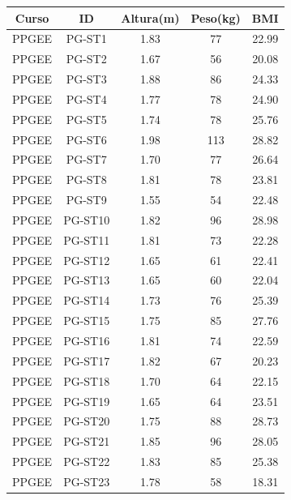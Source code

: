 \documentclass[12pt, a4paper]{article}
\begin{document}
\begin{longtable}{|c|c|c|c|c|}
\hline
\rule[-1.0ex]{0pt}{4.0ex}
\textbf{Curso}&\textbf{ID}&\textbf{Altura(m)}&\textbf{Peso(kg)}&\textbf{BMI}\\ \hline
\endhead
\rule[-1.0ex]{0pt}{4.0ex}
PPGEE&PG-ST1&1.83&77&22.99 \\ \hline
\rule[-1.0ex]{0pt}{4.0ex}
PPGEE&PG-ST2&1.67&56&20.08 \\ \hline
\rule[-1.0ex]{0pt}{4.0ex}
PPGEE&PG-ST3&1.88&86&24.33 \\ \hline
\rule[-1.0ex]{0pt}{4.0ex}
PPGEE&PG-ST4&1.77&78&24.90 \\ \hline
\rule[-1.0ex]{0pt}{4.0ex}
PPGEE&PG-ST5&1.74&78&25.76 \\ \hline
\rule[-1.0ex]{0pt}{4.0ex}
PPGEE&PG-ST6&1.98&113&28.82 \\ \hline
\rule[-1.0ex]{0pt}{4.0ex}
PPGEE&PG-ST7&1.70&77&26.64 \\ \hline
\rule[-1.0ex]{0pt}{4.0ex}
PPGEE&PG-ST8&1.81&78&23.81 \\ \hline
\rule[-1.0ex]{0pt}{4.0ex}
PPGEE&PG-ST9&1.55&54&22.48 \\ \hline
\rule[-1.0ex]{0pt}{4.0ex}
PPGEE&PG-ST10&1.82&96&28.98 \\ \hline
\rule[-1.0ex]{0pt}{4.0ex}
PPGEE&PG-ST11&1.81&73&22.28 \\ \hline
\rule[-1.0ex]{0pt}{4.0ex}
PPGEE&PG-ST12&1.65&61&22.41 \\ \hline
\rule[-1.0ex]{0pt}{4.0ex}
PPGEE&PG-ST13&1.65&60&22.04 \\ \hline
\rule[-1.0ex]{0pt}{4.0ex}
PPGEE&PG-ST14&1.73&76&25.39 \\ \hline
\rule[-1.0ex]{0pt}{4.0ex}
PPGEE&PG-ST15&1.75&85&27.76 \\ \hline
\rule[-1.0ex]{0pt}{4.0ex}
PPGEE&PG-ST16&1.81&74&22.59 \\ \hline
\rule[-1.0ex]{0pt}{4.0ex}
PPGEE&PG-ST17&1.82&67&20.23 \\ \hline
\rule[-1.0ex]{0pt}{4.0ex}
PPGEE&PG-ST18&1.70&64&22.15 \\ \hline
\rule[-1.0ex]{0pt}{4.0ex}
PPGEE&PG-ST19&1.65&64&23.51 \\ \hline
\rule[-1.0ex]{0pt}{4.0ex}
PPGEE&PG-ST20&1.75&88&28.73 \\ \hline
\rule[-1.0ex]{0pt}{4.0ex}
PPGEE&PG-ST21&1.85&96&28.05 \\ \hline
\rule[-1.0ex]{0pt}{4.0ex}
PPGEE&PG-ST22&1.83&85&25.38 \\ \hline
\rule[-1.0ex]{0pt}{4.0ex}
PPGEE&PG-ST23&1.78&58&18.31 \\ \hline

\end{longtable}
\end{document}
